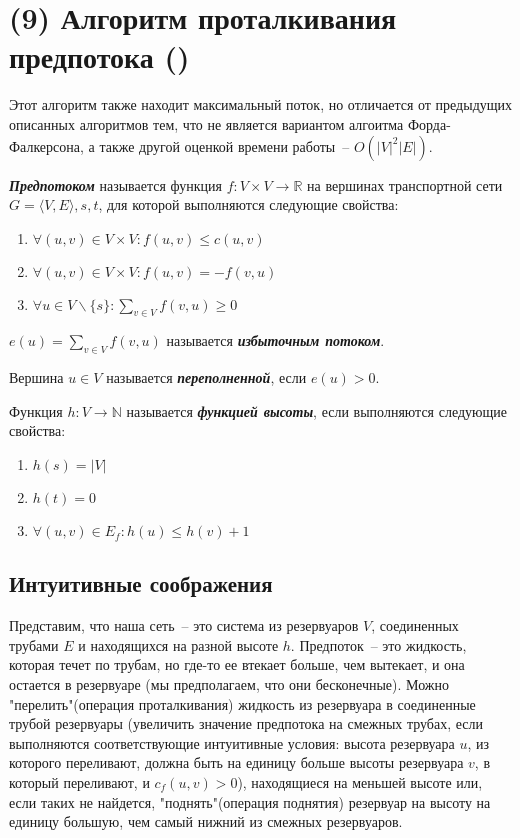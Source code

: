 \let\bf\bfseries
\let\it\itshape
\section{(9) Алгоритм проталкивания предпотока (\groth)}
Этот алгоритм также находит максимальный поток, но отличается от предыдущих описанных алгоритмов тем, что не является вариантом алгоитма Форда-Фалкерсона, а также другой оценкой времени работы~-- $O(|V|^2|E|)$.
\begin{definition}
	{\bf\it Предпотоком} называется функция $f\colon V\times V\to\mathbb{R}$ на вершинах транспортной сети $G=\langle V,E\rangle,s,t$, для которой выполняются следующие свойства:
	\begin{enumerate}
		\item $\forall(u,v)\in V\times V\colon f(u,v)\le c(u,v)$
		\item $\forall(u,v)\in V\times V\colon f(u,v)=-f(v,u)$
		\item $\forall u\in V\smallsetminus\{s\}\colon \sum_{v\in V} f(v,u)\ge0$
	\end{enumerate}
	$e(u)=\sum_{v\in V} f(v,u)$ называется {\bf\it избыточным потоком}.

	Вершина $u\in V$ называется {\bf\it переполненной}, если $e(u)>0$.
\end{definition}
\begin{definition}
	Функция $h\colon V\to\mathbb{N}$ называется {\bf\it функцией высоты}, если выполняются следующие свойства:
	\begin{enumerate}
		\item $h(s)=|V|$
		\item $h(t)=0$
		\item $\forall (u,v)\in E_f\colon h(u)\le h(v)+1$
	\end{enumerate}
\end{definition}
\subsection{Интуитивные соображения}
Представим, что наша сеть~-- это система из резервуаров $V$, соединенных трубами $E$ и находящихся на разной высоте $h$. Предпоток~-- это жидкость, которая течет по трубам, но где-то ее втекает больше, чем вытекает, и она остается в резервуаре (мы предполагаем, что они бесконечные). Можно "перелить"(операция проталкивания) жидкость из резервуара в соединенные трубой резервуары (увеличить значение предпотока на смежных трубах, если выполняются соответствующие интуитивные условия: высота резервуара $u$, из которого переливают, должна быть на единицу больше высоты резервуара $v$, в который переливают, и $c_f(u,v)>0$), находящиеся на меньшей высоте или, если таких не найдется, "поднять"(операция поднятия) резервуар на высоту на единицу большую, чем самый нижний из смежных резервуаров.

